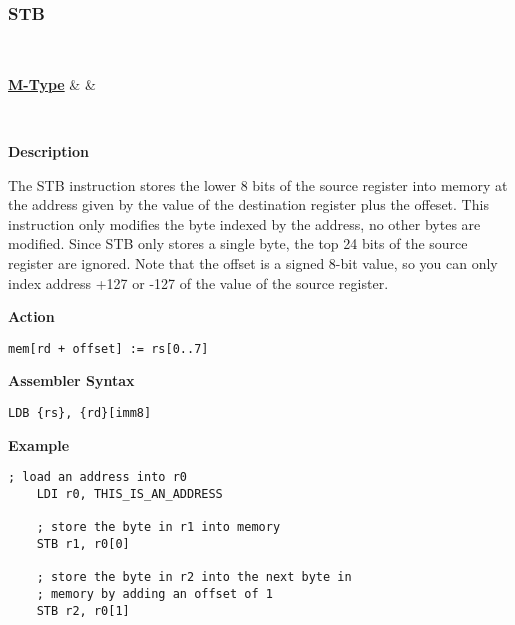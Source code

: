\subsubsection{STB }\label{sec:STB}

\vspace{3ex}

\begin{center}
	\begin{bytefield}[leftcurly=., leftcurlyspace=0pt]{32}
		 \\
		\begin{leftwordgroup}{\hyperref[sec:m-type]{\textbf{M-Type}}}
		 & 
		 &
		\end{leftwordgroup}\\
	\end{bytefield}
\end{center}

\textbf{Description}

The STB instruction stores the lower 8 bits of the source register into memory at the address given by the value of the destination register plus the offeset.
This instruction only modifies the byte indexed by the address, no other bytes are modified.
Since STB only stores a single byte, the top 24 bits of the source register are ignored.
Note that the offset is a signed 8-bit value, so you can only index address +127 or -127 of the value of the source register.

\vspace{3ex}

\textbf{Action}
\begin{lstlisting}[frame=single]
	mem[rd + offset] := rs[0..7]
\end{lstlisting}

\vspace{3ex}

\textbf{Assembler Syntax}
\begin{lstlisting}[frame=single]
	LDB {rs}, {rd}[imm8]
\end{lstlisting}

\vspace{3ex}

\textbf{Example}
\begin{lstlisting}[frame=single]
	; load an address into r0
	LDI r0, THIS_IS_AN_ADDRESS
	
	; store the byte in r1 into memory
	STB r1, r0[0]
	
	; store the byte in r2 into the next byte in
	; memory by adding an offset of 1
	STB r2, r0[1]
\end{lstlisting}